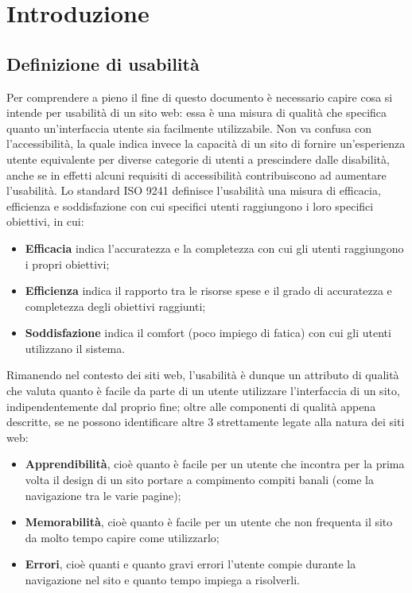 \section{Introduzione}

\subsection{Definizione di usabilità}
Per comprendere a pieno il fine di questo documento è necessario capire cosa si intende per usabilità di un sito web: essa è una misura di qualità che specifica quanto un'interfaccia utente sia facilmente utilizzabile. Non va confusa con l'accessibilità, la quale indica invece la capacità di un sito di fornire un'esperienza utente equivalente per diverse categorie di utenti a prescindere dalle disabilità, anche se in effetti alcuni requisiti di accessibilità contribuiscono ad aumentare l'usabilità.
Lo standard ISO 9241 definisce l'usabilità una misura di efficacia, efficienza e soddisfazione con cui specifici utenti raggiungono i loro specifici obiettivi, in cui:

\begin{itemize}
	\item \textbf{Efficacia} indica l'accuratezza e la completezza con cui gli utenti raggiungono i propri obiettivi;
	\item \textbf{Efficienza} indica il rapporto tra le risorse spese e il grado di accuratezza e completezza degli obiettivi raggiunti;
	\item \textbf{Soddisfazione} indica il comfort (poco impiego di fatica) con cui gli utenti utilizzano il sistema.
\end{itemize}

Rimanendo nel contesto dei siti web, l'usabilità è dunque un attributo di qualità che valuta quanto è facile da parte di un utente utilizzare l'interfaccia di un sito, indipendentemente dal proprio fine; oltre alle componenti di qualità appena descritte, se ne possono identificare altre 3 strettamente legate alla natura dei siti web:

\begin{itemize}
	\item \textbf{Apprendibilità}, cioè quanto è facile per un utente che incontra per la prima volta il design di un sito portare a compimento compiti banali (come la navigazione tra le varie pagine);
	\item \textbf{Memorabilità}, cioè quanto è facile per un utente che non frequenta il sito da molto tempo capire come utilizzarlo;
	\item \textbf{Errori}, cioè quanti e quanto gravi errori l'utente compie durante la navigazione nel sito e quanto tempo impiega a risolverli.
\end{itemize}

